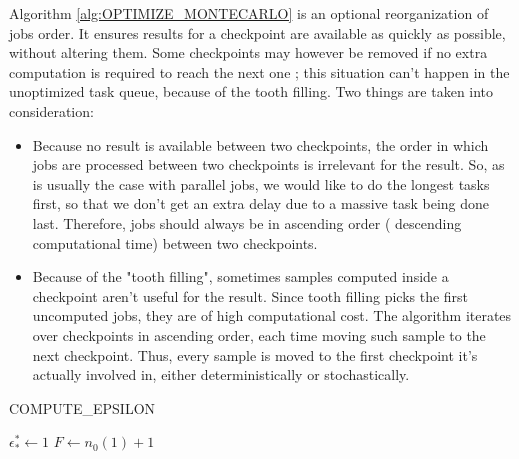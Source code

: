 \documentclass[./thesis.tex]{subfiles}
\begin{document}
Algorithm \ref{alg:OPTIMIZE_MONTECARLO} is an optional reorganization of jobs order. It ensures results for a checkpoint are available as quickly as possible, without altering them. Some checkpoints may however be removed if no extra computation is required to reach the next one ; this situation can't happen in the unoptimized task queue, because of the tooth filling. Two things are taken into consideration:
\begin{itemize}
\item
Because no result is available between two checkpoints, the order in which jobs are processed between two checkpoints is irrelevant for the result. So, as is usually the case with parallel jobs, we would like to do the longest tasks first, so that we don't get an extra delay due to a massive task being done last. Therefore, jobs should always be in ascending order ( descending computational time) between two checkpoints.
\item
Because of the "tooth filling", sometimes samples computed inside a checkpoint aren't useful for the result. Since tooth filling picks the first uncomputed jobs, they are of high computational cost. The algorithm iterates over checkpoints in ascending order, each time moving such sample to the next checkpoint. Thus, every sample is moved to the first checkpoint it's actually involved in, either deterministically or stochastically.
\end{itemize}





\begin{algorithm}
	\label{COMPUTE_EPSILON}
	\caption{COMPUTE\_EPSILON}
		\KwResult{ $\tilde \epsilon$}
		$\epsilon^*_* \gets 1$ \;
		$F \gets n_0(1)+1$ \;		
\end{algorithm}
\end{document}
